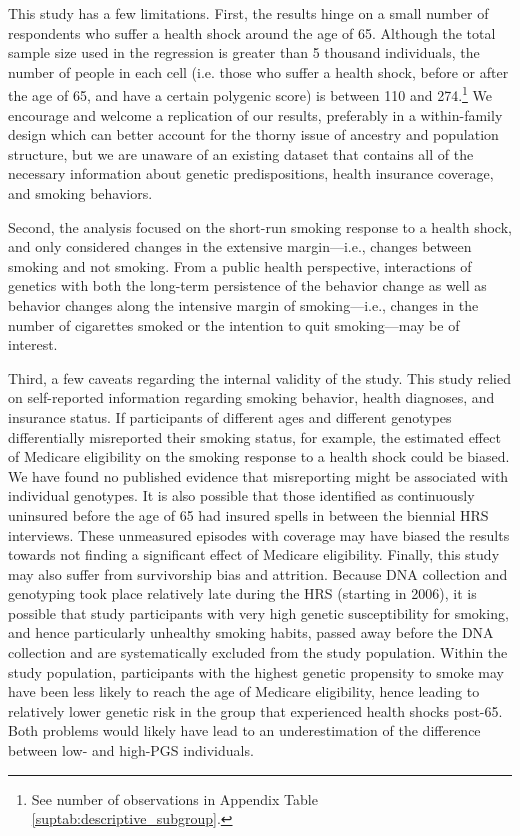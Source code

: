 \documentclass[11pt]{article}
\begin{document}
This study has a few limitations.
First, the results hinge on a small number of respondents who suffer a health shock around the age of 65. Although the total sample size used in the regression is greater than 5 thousand individuals, the number of people in each cell (i.e. those who suffer a health shock, before or after the age of 65, and have a certain polygenic score) is between 110 and 274.\footnote{See number of observations in Appendix Table \ref{suptab:descriptive_subgroup}.}
We encourage and welcome a replication of our results, preferably in a within-family design which can better account for the thorny issue of ancestry and population structure, but we are unaware of an existing dataset that contains all of the necessary information about genetic predispositions, health insurance coverage, and smoking behaviors.

Second, the analysis focused on the short-run smoking response to a health shock, and only considered changes in the extensive margin---i.e., changes between smoking and not smoking.
From a public health perspective, interactions of genetics with both the long-term persistence of the behavior change as well as behavior changes along the intensive margin of smoking---i.e., changes in the number of cigarettes smoked or the intention to quit smoking---may be of interest.

Third, a few caveats regarding the internal validity of the study.
This study relied on self-reported information regarding smoking behavior, health diagnoses, and insurance status.
If participants of different ages and different genotypes differentially misreported their smoking status, for example, the estimated effect of Medicare eligibility on the smoking response to a health shock could be biased.
We have found no published evidence that misreporting might be associated with individual genotypes.
It is also possible that those identified as continuously uninsured before the age of 65 had insured spells in between the biennial HRS interviews.
These unmeasured episodes with coverage may have biased the results towards not finding a significant effect of Medicare eligibility.
Finally, this study may also suffer from survivorship bias and attrition.
Because DNA collection and genotyping took place relatively late during the HRS (starting in 2006), it is possible that study participants with very high genetic susceptibility for smoking, and hence particularly unhealthy smoking habits, passed away before the DNA collection and are systematically excluded from the study population.
Within the study population, participants with the highest genetic propensity to smoke may have been less likely to reach the age of Medicare eligibility, hence leading to relatively lower genetic risk in the group that experienced health shocks post-65.
Both problems would likely have lead to an underestimation of the difference between low- and high-PGS individuals.
\end{document}
